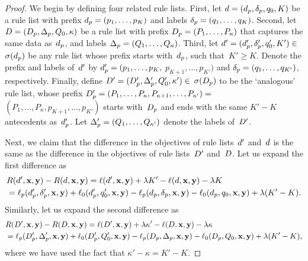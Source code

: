 \begin{arxiv}
\begin{proof}
We begin by defining four related rule lists.
%
First, let ${{d} = (d_p, \delta_p, q_0, K)}$
be a rule list with prefix ${d_p = (p_1, \dots, p_K)}$
and labels ${\delta_p = (q_1, \dots, q_K)}$.
%
Second, let ${{D} = (D_p, \Delta_p, Q_0, \kappa)}$
be a rule list with prefix ${D_p = (P_1, \dots, P_\kappa)}$
that captures the same data as~$d_p$,
and labels ${\Delta_p = (Q_1, \dots, Q_\kappa)}$.
%
Third, let ${{d}' = (d_p', \delta_p', q_0', K') \in}$
${\sigma(d_p)}$ be any rule list
whose prefix starts with~$d_p$, such that~${K' \ge K}$.
%
Denote the prefix and labels of~${d}'$ by
${d_p' = (p_1, \dots, p_K,}$ ${p_{K+1}, \dots, p_{K'})}$
and ${\delta_p = (q_1, \dots, q_{K'})}$, respectively.
%
Finally, define ${{D}' = (D_p', \Delta_p', Q_0', \kappa') \in}$
${\sigma(D_p)}$ to be the `analogous' rule list, \ie whose prefix
${D_p' = (P_1, \dots, P_\kappa, P_{\kappa+1}, \dots, P_{\kappa'}) =}$
${(P_1, \dots, P_\kappa, p_{K+1}, \dots, p_{K'})}$
starts with~$D_p$ and ends with the same ${K'-K}$
antecedents as~$d_p'$.
%
Let ${\Delta_p' = (Q_1, \dots, Q_{\kappa'})}$
denote the labels of~${D}'$.

Next, we claim that the difference in the objectives
of rule lists~${d}'$ and~${d}$ is the same as the difference
in the objectives of rule lists~${D}'$ and~${D}$.
%
Let us expand the first difference as
\begin{align}
&R({d}', \mathbf{x}, \mathbf{y}) - R({d}, \mathbf{x}, \mathbf{y})
  = \ell({d}', \mathbf{x}, \mathbf{y}) + {\lambda} K' - \ell({d}, \mathbf{x}, \mathbf{y}) - {\lambda} K \nonumber \\
&= \ell_p(d_p', \delta_p', \mathbf{x}, \mathbf{y}) + \ell_0(d_p', q_0', \mathbf{x}, \mathbf{y})
  - \ell_p(d_p, \delta_p, \mathbf{x}, \mathbf{y}) - \ell_0(d_p, q_0, \mathbf{x}, \mathbf{y})
  + {\lambda} (K' - K). \nonumber
\end{align}
Similarly, let us expand the second difference as
\begin{align}
&R({D}', \mathbf{x}, \mathbf{y}) - R({D}, \mathbf{x}, \mathbf{y})
  = \ell({D}', \mathbf{x}, \mathbf{y}) + {\lambda} \kappa' - \ell({D}, \mathbf{x}, \mathbf{y}) - {\lambda} \kappa \nonumber \\
&= \ell_p(D_p', \Delta_p', \mathbf{x}, \mathbf{y}) + \ell_0(D_p', Q_0', \mathbf{x}, \mathbf{y})
  - \ell_p(D_p, \Delta_p, \mathbf{x}, \mathbf{y}) - \ell_0(D_p, Q_0, \mathbf{x}, \mathbf{y})
  + {\lambda} (K' - K), \nonumber
\end{align}
where we have used the fact that ${\kappa' - \kappa = K' - K}$.


\end{proof}
\end{arxiv}

